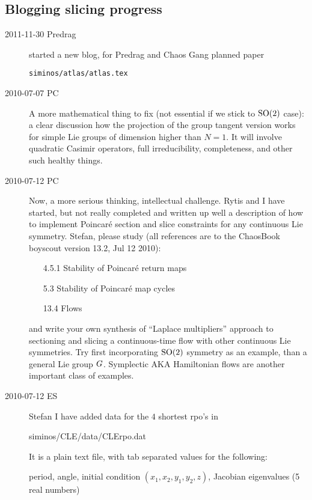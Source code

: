 \subsection{Blogging slicing progress}
\label{chap:atlasBlog}

\begin{description}
\item[2011-11-30 Predrag]
started a new blog, for Predrag and Chaos Gang planned paper

\texttt{siminos/atlas/atlas.tex}


\item[2010-07-07 PC]                                    \toCB
A more mathematical thing to fix (not essential if we stick to $\textrm{SO}(2)$
case): a clear discussion how the projection of the group tangent version
works for simple Lie groups of dimension higher than $N=1$. It will
involve quadratic Casimir operators, full irreducibility, completeness,
and other such healthy things.

\item[2010-07-12 PC] Now, a more serious thinking, intellectual
challenge. Rytis and I have started, but not really completed and written
up well a description of how to implement Poincar\'e section and slice
constraints for any continuous Lie symmetry. Stefan, please study (all
references are to the ChaosBook boyscout version 13.2, Jul 12 2010):
\begin{itemize}
  \item[4.5.1] Stability of Poincar\'e return maps
  \item[5.3] Stability of Poincar\'e map cycles
  \item[13.4] Flows
\end{itemize}
and write your own synthesis of ``Laplace multipliers'' approach to
sectioning and slicing a continuous-time flow with other continuous Lie
symmetries. Try first incorporating $\textrm{SO}(2)$ symmetry as an example, than
a general Lie group $G$. Symplectic AKA Hamiltonian flows are
another important class of examples.

\item[2010-07-12 ES]                                \toCB
Stefan I have added data for the $4$ shortest rpo's
in

siminos/CLE/data/CLErpo.dat

It is a plain text file, with tab separated values for the following:

period, angle, initial condition $(x_1,x_2,y_1,y_2,z)$,
Jacobian eigenvalues (5 real numbers)


\end{description}
